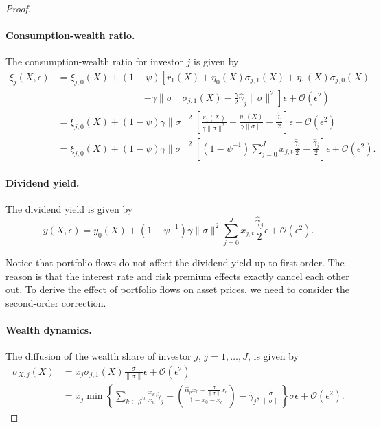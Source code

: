 \begin{proof}
\paragraph{Consumption-wealth ratio.} The consumption-wealth ratio for investor $j$ is given by
\begin{align}
    \xi_{j}(X,\epsilon) &= \xi_{j,0}(X) + (1-\psi) \left[ r_1(X) + \eta_0(X) \sigma_{j,1}(X) + \eta_{1}(X) \sigma_{j,0}(X)\right.\nonumber\\
    &\qquad\qquad\qquad\qquad\quad\left. -\gamma \|\sigma\| \sigma_{j,1}(X) - \frac{\gamma}{2} \hat{\gamma}_j \|\sigma\|^2 \right]\epsilon + \mathcal{O}(\epsilon^2)\nonumber\\
    &= \xi_{j,0}(X) + (1-\psi) \gamma \|\sigma\|^2 \left[ \frac{r_1(X)}{\gamma \|\sigma\|^2}  + \frac{\eta_{1}(X)}{\gamma \|\sigma\|}  - \frac{\hat{\gamma}_j}{2}  \right]\epsilon + \mathcal{O}(\epsilon^2)\nonumber\\
    &= \xi_{j,0}(X) + (1-\psi) \gamma \|\sigma\|^2 \left[\left(1-\psi^{-1}\right)  \sum_{j=0}^J x_{j,t}\frac{\hat{\gamma}_j}{2}- \frac{\hat{\gamma}_j}{2}  \right]\epsilon + \mathcal{O}(\epsilon^2).
\end{align}

\paragraph{Dividend yield.} The dividend yield is given by
\begin{equation}\label{eq:div-yield_first_order}
    y(X,\epsilon) = y_0(X) + \left(1-\psi^{-1}\right) \gamma \|\sigma\|^2 \sum_{j=0}^J x_{j,t}\frac{\hat{\gamma}_j}{2} \epsilon + \mathcal{O}(\epsilon^2).
\end{equation}

Notice that portfolio flows do not affect the dividend yield up to first order. The reason is that the interest rate and risk premium effects exactly cancel each other out. To derive the effect of portfolio flows on asset prices, we need to consider the second-order correction. 

\paragraph{Wealth dynamics.} The diffusion of the wealth share of investor $j$, $j=1,\ldots,J$, is given by
\begin{align}
    \sigma_{X,j}(X) &= x_j \sigma_{j,1}(X) \frac{\sigma}{\|\sigma\|} \epsilon + \mathcal{O}(\epsilon^2)\nonumber\\
    &= x_j \min\left\{ \sum_{k\in\mathcal{J}^u} \frac{x_k}{x_u} \hat{\gamma}_j -\left(\frac{\hat{\alpha}_p  x_0+\frac{\hat{\sigma}}{\|\sigma\|} x_c }{1-x_0-x_c}\right)- \hat{\gamma}_j  ,\frac{\hat{\sigma}}{\|\sigma\|}  \right\} \sigma \epsilon + \mathcal{O}(\epsilon^2).
\end{align}




\end{proof}
